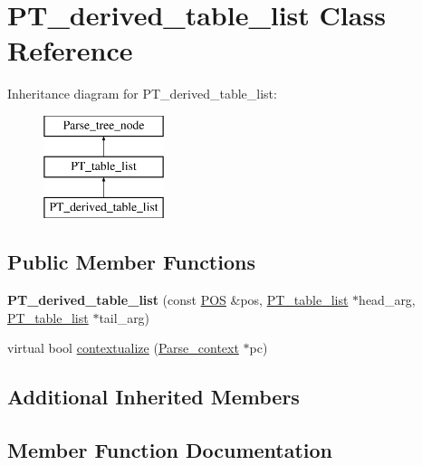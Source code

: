 \hypertarget{classPT__derived__table__list}{}\section{P\+T\+\_\+derived\+\_\+table\+\_\+list Class Reference}
\label{classPT__derived__table__list}
Inheritance diagram for P\+T\+\_\+derived\+\_\+table\+\_\+list\+:\begin{figure}[H]
\begin{center}
\leavevmode
\includegraphics[height=3.000000cm]{classPT__derived__table__list}
\end{center}
\end{figure}
\subsection*{Public Member Functions}
\begin{DoxyCompactItemize}
\item 
\mbox{\label{classPT__derived__table__list_afa83801f7fbe3f6f76ba0c5bb7f1184b}} 
{\bfseries P\+T\+\_\+derived\+\_\+table\+\_\+list} (const \mbox{\hyperlink{structYYLTYPE}{P\+OS}} \&pos, \mbox{\hyperlink{classPT__table__list}{P\+T\+\_\+table\+\_\+list}} $\ast$head\+\_\+arg, \mbox{\hyperlink{classPT__table__list}{P\+T\+\_\+table\+\_\+list}} $\ast$tail\+\_\+arg)
\item 
virtual bool \mbox{\hyperlink{classPT__derived__table__list_a10b645eaf6a3221bdffba3aa2e62905f}{contextualize}} (\mbox{\hyperlink{structParse__context}{Parse\+\_\+context}} $\ast$pc)
\end{DoxyCompactItemize}
\subsection*{Additional Inherited Members}


\subsection{Member Function Documentation}
\mbox{\label{classPT__derived__table__list_a10b645eaf6a3221bdffba3aa2e62905f}} 
